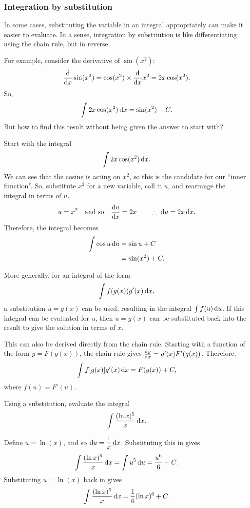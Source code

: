 \subsubsection{Integration by substitution} 

In some cases, substituting the variable in an integral appropriately can make it easier to evaluate. In a sense, integration by substitution is like differentiating using the chain rule, but in reverse.

For example, consider the derivative of $\sin(x^2)$:
\[
\frac{{\rm d} }{{\rm d} x}\sin(x^2)=\cos(x^2)\times\frac{{\rm d} }{{\rm d} x}x^2=2x\cos(x^2).
\]
So,
\[
\int 2x\cos(x^2)\,{\rm d}x=\sin(x^2)+C.
\]
But how to find this result without being given the answer to start with?

Start with the integral
\[
\int 2x\cos(x^2)\,{\rm d}x.
\]
We can see that the cosine is acting on $x^2$, so this is the candidate for our ``inner function''. So, substitute $x^2$ for a new variable, call it $u$, and rearrange the integral in terms of $u$.
\[
u=x^2 \quad\text{and so}\quad \frac{{\rm d} u}{{\rm d} x}=2x
\qquad \therefore \; {\rm d}u=2x\,{\rm d}x.
\]
Therefore, the integral becomes
\begin{align*}
\int\cos u\,{\rm d}u &=\sin u+C\\
&=\sin(x^2)+C.
\end{align*}

More generally, for an integral of the form
\[
\int f(g(x))g'(x)\,{\rm d}x,
\]
a substitution $u=g(x)$ can be used, resulting in the integral $\int f(u)\,{\rm d} u$. If this integral can be evaluated for $u$, then $u=g(x)$ can be substituted back into the result to give the solution in terms of $x$.

This can also be derived directly from the chain rule. Starting with a function of the form $y=F(g(x))$, the chain rule gives $\frac{{\rm d} y}{{\rm d} x} = g'(x)F'(g(x))$. Therefore,
\[
\int f[g(x)]g'(x)\,{\rm d}x=F(g(x))+C,
\]
where $f(u)=F'(u)$.

\begin{example}[DIY]
Using a substitution, evaluate the integral
\[
\int\frac{(\ln x)^5}{x}\,{\rm d}x.
\]
\end{example}

\begin{blanksol}
Define $u=\ln(x)$, and so ${\rm d}u=\dfrac{1}{x}\,{\rm d}x$. Substituting this in gives
\[
\int\frac{(\ln x)^5}{x}\,{\rm d}x=\int u^5\,{\rm d}u=\frac{u^6}{6}+C.
\]
Substituting $u=\ln(x)$ back in gives
\[
\int\frac{(\ln x)^5}{x}\,{\rm d}x=\frac{1}{6}(\ln x)^6+C.
\]
\end{blanksol}

